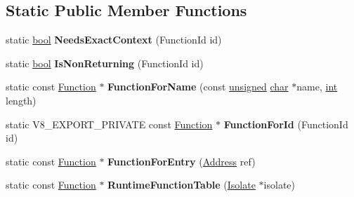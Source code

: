 \subsection*{Static Public Member Functions}
\begin{DoxyCompactItemize}
\item 
\mbox{\label{classv8_1_1internal_1_1Runtime_a115205fb9e1e20b4804b8c1241568570}} 
static \mbox{\hyperlink{classbool}{bool}} {\bfseries Needs\+Exact\+Context} (Function\+Id id)
\item 
\mbox{\label{classv8_1_1internal_1_1Runtime_a69ef8cb7fc9fb66bea5959d2a1b3b7ec}} 
static \mbox{\hyperlink{classbool}{bool}} {\bfseries Is\+Non\+Returning} (Function\+Id id)
\item 
\mbox{\label{classv8_1_1internal_1_1Runtime_afa94bb5dc5507bd0ee93dc9a6f6bfd5a}} 
static const \mbox{\hyperlink{structv8_1_1internal_1_1Runtime_1_1Function}{Function}} $\ast$ {\bfseries Function\+For\+Name} (const \mbox{\hyperlink{classunsigned}{unsigned}} \mbox{\hyperlink{classchar}{char}} $\ast$name, \mbox{\hyperlink{classint}{int}} length)
\item 
\mbox{\label{classv8_1_1internal_1_1Runtime_a1fb4256645450f73e9ee39d4f38f3d58}} 
static V8\+\_\+\+E\+X\+P\+O\+R\+T\+\_\+\+P\+R\+I\+V\+A\+TE const \mbox{\hyperlink{structv8_1_1internal_1_1Runtime_1_1Function}{Function}} $\ast$ {\bfseries Function\+For\+Id} (Function\+Id id)
\item 
\mbox{\label{classv8_1_1internal_1_1Runtime_a82e21040bb88fd62e811b273d9592b62}} 
static const \mbox{\hyperlink{structv8_1_1internal_1_1Runtime_1_1Function}{Function}} $\ast$ {\bfseries Function\+For\+Entry} (\mbox{\hyperlink{classuintptr__t}{Address}} ref)
\item 
\mbox{\label{classv8_1_1internal_1_1Runtime_a0992be0188c64085327b7dfbadb43b5b}} 
static const \mbox{\hyperlink{structv8_1_1internal_1_1Runtime_1_1Function}{Function}} $\ast$ {\bfseries Runtime\+Function\+Table} (\mbox{\hyperlink{classv8_1_1internal_1_1Isolate}{Isolate}} $\ast$isolate)
\item 
\mbox{\label{classv8_1_1internal_1_1Runtime_a10d124df53f096f5ae5190f8bfa23c33}} 

\end{DoxyCompactItemize}
